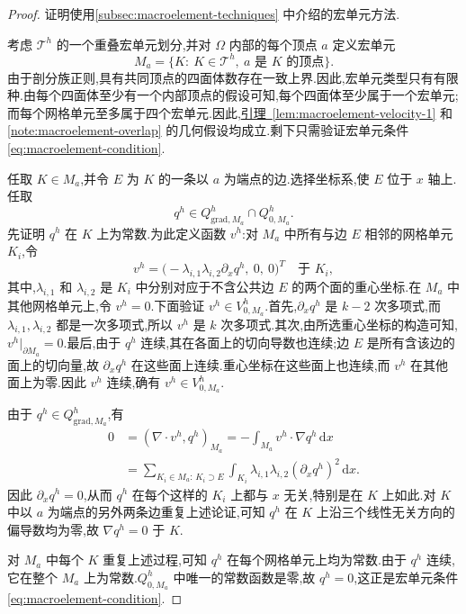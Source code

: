 \begin{proof}
证明使用\cref{subsec:macroelement-techniques} 中介绍的宏单元方法.

考虑 $\mathcal{T}^h$ 的一个重叠宏单元划分,并对 $\Omega$ 内部的每个顶点 $a$ 定义宏单元
\[
  M_a=\{K:\ K\in\mathcal{T}^h,\ a\text{ 是 }K\text{ 的顶点}\}.
\]
由于剖分族正则,具有共同顶点的四面体数存在一致上界.因此,宏单元类型只有有限种.由每个四面体至少有一个内部顶点的假设可知,每个四面体至少属于一个宏单元;而每个网格单元至多属于四个宏单元.因此,\hyperref[lem:macroelement-velocity-1]{引理~\ref{lem:macroelement-velocity-1}} 和\cref{note:macroelement-overlap} 的几何假设均成立.剩下只需验证宏单元条件\cref{eq:macroelement-condition}.

任取 $K\in M_a$,并令 $E$ 为 $K$ 的一条以 $a$ 为端点的边.选择坐标系,使 $E$ 位于 $x$ 轴上.任取
\[
  q^h\in Q_{\mathrm{grad},M_a}^h\cap Q_{0,M_a}^h.
\]
先证明 $q^h$ 在 $K$ 上为常数.为此定义函数 $v^h$:对 $M_a$ 中所有与边 $E$ 相邻的网格单元 $K_i$,令
\[
  v^h=\bigl(-\lambda_{i,1}\lambda_{i,2}\partial_xq^h,\ 0,\ 0\bigr)^T
  \quad\text{于 }K_i,
\]
其中,$\lambda_{i,1}$ 和 $\lambda_{i,2}$ 是 $K_i$ 中分别对应于不含公共边 $E$ 的两个面的重心坐标.在 $M_a$ 中其他网格单元上,令 $v^h=0$.下面验证 $v^h\in V_{0,M_a}^h$.首先,$\partial_xq^h$ 是 $k-2$ 次多项式,而 $\lambda_{i,1},\lambda_{i,2}$ 都是一次多项式,所以 $v^h$ 是 $k$ 次多项式.其次,由所选重心坐标的构造可知,$v^h|_{\partial M_a}=0$.最后,由于 $q^h$ 连续,其在各面上的切向导数也连续;边 $E$ 是所有含该边的面上的切向量,故 $\partial_xq^h$ 在这些面上连续.重心坐标在这些面上也连续,而 $v^h$ 在其他面上为零.因此 $v^h$ 连续,确有 $v^h\in V_{0,M_a}^h$.

由于 $q^h\in Q_{\mathrm{grad},M_a}^h$,有
\[
\begin{aligned}
  0&=(\nabla\cdot v^h,q^h)_{M_a}
    =-\int_{M_a}v^h\cdot\nabla q^h\,\mathrm{d}x\\
   &=\sum_{K_i\in M_a:\,K_i\supset E}
       \int_{K_i}\lambda_{i,1}\lambda_{i,2}
              (\partial_xq^h)^2\,\mathrm{d}x.
\end{aligned}
\]
因此 $\partial_xq^h=0$,从而 $q^h$ 在每个这样的 $K_i$ 上都与 $x$ 无关,特别是在 $K$ 上如此.对 $K$ 中以 $a$ 为端点的另外两条边重复上述论证,可知 $q^h$ 在 $K$ 上沿三个线性无关方向的偏导数均为零,故 $\nabla q^h=0$ 于 $K$.

对 $M_a$ 中每个 $K$ 重复上述过程,可知 $q^h$ 在每个网格单元上均为常数.由于 $q^h$ 连续,它在整个 $M_a$ 上为常数.$Q_{0,M_a}^h$ 中唯一的常数函数是零,故 $q^h=0$,这正是宏单元条件\cref{eq:macroelement-condition}.
\end{proof}

